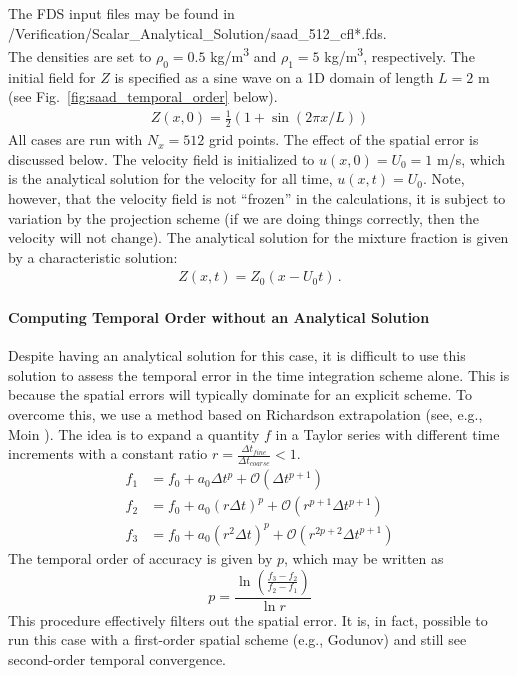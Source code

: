 \documentclass[11pt]{book}
\begin{document}
The FDS input files may be found in\\
{\ct /Verification/Scalar\_Analytical\_Solution/saad\_512\_cfl*.fds}.\\

\noindent The densities are set to $\rho_0 = 0.5$ \si{kg/m^3} and $\rho_1 = 5$ \si{kg/m^3}, respectively.  The initial field for $Z$ is specified as a sine wave on a 1D domain of length $L=2$ m (see Fig.~\ref{fig:saad_temporal_order} below).
\begin{align}
Z(x,0) = \frac{1}{2}\left( 1 + \sin(2\pi x/L) \right)
\end{align}
All cases are run with $N_x = 512$ grid points.  The effect of the spatial error is discussed below. The velocity field is initialized to $u(x,0) = U_0 = 1$ m/s, which is the analytical solution for the velocity for all time, $u(x,t) = U_0$.  Note, however, that the velocity field is not ``frozen'' in the calculations, it is subject to variation by the projection scheme (if we are doing things correctly, then the velocity will not change).  The analytical solution for the mixture fraction is given by a characteristic solution:
\begin{align}
Z(x,t) = Z_0(x-U_0 t) \,\mbox{.}
\end{align}

\paragraph{Computing Temporal Order without an Analytical Solution}

Despite having an analytical solution for this case, it is difficult to use this solution to assess the temporal error in the time integration scheme alone.  This is because the spatial errors will typically dominate for an explicit scheme.  To overcome this, we use a method based on Richardson extrapolation (see, e.g., Moin \cite{Moin:2001}).  The idea is to expand a quantity $f$ in a Taylor series with different time increments with a constant ratio $r = \frac{\Delta t_{fine}}{\Delta t_{coarse}} < 1$.
\begin{align}
f_1 &= f_0 + a_0 \Delta t^p + \mathcal{O}(\Delta t^{p+1}) \\
f_2 &= f_0 + a_0 (r \Delta t)^p + \mathcal{O}(r^{p+1} \Delta t^{p+1}) \\
f_3 &= f_0 + a_0 (r^2 \Delta t)^p + \mathcal{O}(r^{2p+2} \Delta t^{p+1})
\end{align}
The temporal order of accuracy is given by $p$, which may be written as
\begin{equation}
\label{eq:temporal_order}
p = \frac{\ln \left(\frac{f_3-f_2}{f_2-f_1}\right)}{\ln r}
\end{equation}
This procedure effectively filters out the spatial error.  It is, in fact, possible to run this case with a first-order spatial scheme (e.g., Godunov) and still see second-order temporal convergence.
\end{document}

